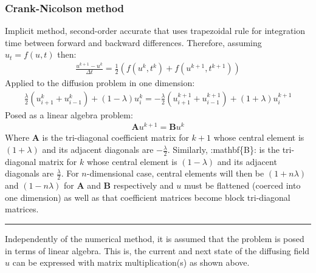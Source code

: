 \documentclass[letterpaper,10pt,english]{sphinxmanual}
\begin{document}
\subsubsection{Crank-Nicolson method}
\label{\detokenize{diffusion:crank-nicolson-method}}
Implicit method, second-order accurate that uses trapezoidal rule for
integration time between forward and backward differences. Therefore,
assuming \(u_t=f(u,t)\) then:
\begin{equation*}
\begin{split}\frac{u^{k+1}-u^k}{\Delta t}=\frac{1}{2}\left(f(u^k,t^k)+f(u^{k+1  },t^{k+1})\right)\end{split}
\end{equation*}
Applied to the diffusion problem in one dimension:
\begin{equation*}
\begin{split}\frac{\lambda}{2}\left(u_{i+1}^k+u_{i-1}^k\right)+\left(1-  \lambda\right)u_i^k=-\frac{\lambda}{2}\left(u_{i+1}^{k+1}+  u_{i-1}^{k+1}\right)+\left(1+\lambda\right)u_i^{k+1}\end{split}
\end{equation*}
Posed as a linear algebra problem:
\begin{equation*}
\begin{split}\mathbf{A}u^{k+1}=\mathbf{B}u^k\end{split}
\end{equation*}
Where \(\mathbf{A}\) is the tri-diagonal coefficient matrix for
\(k+1\) whose central element is \((1+\lambda)\) and its
adjacent diagonals are \(-\frac{\lambda}{2}\). Similarly,
:mathbf\{B\}: is the tri-diagonal matrix for \(k\) whose central
element is \((1-\lambda)\) and its adjacent diagonals are
\(\frac{\lambda}{2}\). For \(n\)-dimensional case, central
elements will then be \((1+n\lambda)\) and \((1-n\lambda)\)
for \(\mathbf{A}\) and \(\mathbf{B}\) respectively and
\(u\) must be flattened (coerced into one dimension) as well as that
coefficient matrices become block tri-diagonal matrices.


\bigskip\hrule\bigskip


Independently of the numerical method, it is assumed that the problem is
posed in terms of linear algebra. This is, the current and next state
of the diffusing field \(u\) can be expressed with matrix
multiplication(s) as shown above.
\end{document}
